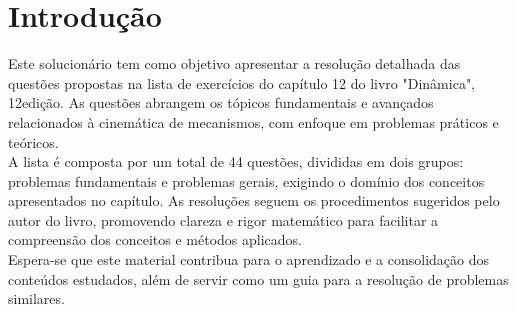 \section*{Introdução}

Este solucionário tem como objetivo apresentar a resolução detalhada das questões propostas na lista de exercícios do capítulo 12 do livro "Dinâmica", 12\textordfeminine edição. As questões abrangem os tópicos fundamentais e avançados relacionados à cinemática de mecanismos, com enfoque em problemas práticos e teóricos.\\

A lista é composta por um total de 44 questões, divididas em dois grupos: problemas fundamentais e problemas gerais, exigindo o domínio dos conceitos apresentados no capítulo. As resoluções seguem os procedimentos sugeridos pelo autor do livro, promovendo clareza e rigor matemático para facilitar a compreensão dos conceitos e métodos aplicados.\\

Espera-se que este material contribua para o aprendizado e a consolidação dos conteúdos estudados, além de servir como um guia para a resolução de problemas similares.\\
